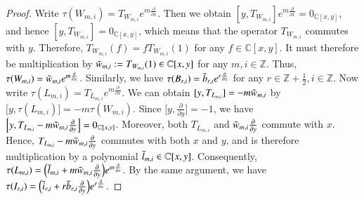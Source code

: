 \documentclass[12pt,reqno]{amsart}
\def\Z{\mathbb{Z}}
\def\C{\mathbb{C}}
\numberwithin{equation}{section}
\begin{document}
\begin{proof}
Write $\tau(W_{m,i})=T_{W_{m,i}}e^{m\frac{\partial}{\partial{x}}}$. Then we obtain $[y,T_{W_{m,i}}]e^{m\frac{\partial}{\partial{x}}}=0_{\C[x,y]}$, and hence $[y,T_{W_{m,i}}]=0_{\C[x,y]}$, which means that the operator $T_{W_{m,i}}$ commutes with $y$. Therefore, $T_{W_{m,i}}(f)=fT_{W_{m,i}}(1)$ for any $f\in\C[x,y]$. It must therefore be multiplication by $\Tilde{w}_{m,i}:=T_{W_{m,i}}(1)\in\C[x,y]$ for any $m,i\in\Z$. Thus, $\tau(W_{m,i})=\Tilde{w}_{m,i}e^{m\frac{\partial}{\partial{x}}}$. Similarly, we have $\tau(B_{r,i})=\Tilde{b}_{r,i}e^{r\frac{\partial}{\partial{x}}}$ for any $r\in\Z+\frac{1}{2},i\in\Z$. Now write $\tau(L_{m,i})=T_{L_{m,i}}e^{m\frac{\partial}{\partial{x}}}$. We can obtain $[y,T_{L_{m,i}}]=-m\Tilde{w}_{m,i}$ by $\big[y,\tau(L_{m,i})  \big]=-m\tau(W_{m,i})$. Since $\Big[ y,\frac{\partial}{\partial{y}}  \Big]=-1$, we have $\left[ y,  T_{L_{m,i}}-m \Tilde{w}_{m,i}  \frac{\partial}{\partial{y}}  \right]=0_{\C[x,y]}$.
Moreover, both $T_{L_{m,i}}$ and $\Tilde{w}_{m,i}\frac{\partial}{\partial{y}}$ commute with $x$. Hence, $T_{L_{m,i}}-m\Tilde{w}_{m,i}\frac{\partial}{\partial{y}}$ commutes with both $x$ and $y$, and is therefore multiplication by a polynomial $\Tilde{l}_{m,i}\in\C[x,y]$. Consequently, $\tau(L_{m,i})=\Big( \Tilde{l}_{m,i}+m\Tilde{w}_{m,i}\frac{\partial}{\partial{y}}  \Big)e^{m\frac{\partial}{\partial{x}}}$. By the same argument, we have $\tau(I_{r,i})=\Big( \Tilde{i}_{r,i}+r\Tilde{b}_{r,i}\frac{\partial}{\partial{y}}  \Big)e^{r\frac{\partial}{\partial{x}}}$. 


\end{proof}
\end{document}
